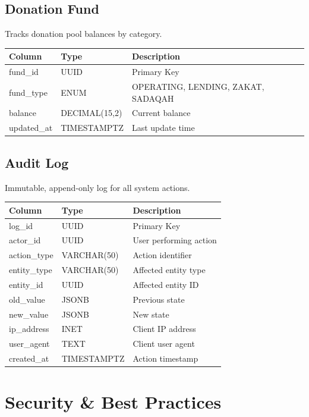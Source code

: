 \documentclass[11pt,a4paper]{article}
\begin{document}
\subsection{Donation Fund}

Tracks donation pool balances by category.

\begin{tabular}{@{}p{4cm}p{3cm}p{6cm}@{}}
\toprule
\textbf{Column} & \textbf{Type} & \textbf{Description} \\
\midrule
fund\_id & UUID & Primary Key \\
fund\_type & ENUM & OPERATING, LENDING, ZAKAT, SADAQAH \\
balance & DECIMAL(15,2) & Current balance \\
updated\_at & TIMESTAMPTZ & Last update time \\
\bottomrule
\end{tabular}

\subsection{Audit Log}

Immutable, append-only log for all system actions.

\begin{tabular}{@{}p{4cm}p{3cm}p{6cm}@{}}
\toprule
\textbf{Column} & \textbf{Type} & \textbf{Description} \\
\midrule
log\_id & UUID & Primary Key \\
actor\_id & UUID & User performing action \\
action\_type & VARCHAR(50) & Action identifier \\
entity\_type & VARCHAR(50) & Affected entity type \\
entity\_id & UUID & Affected entity ID \\
old\_value & JSONB & Previous state \\
new\_value & JSONB & New state \\
ip\_address & INET & Client IP address \\
user\_agent & TEXT & Client user agent \\
created\_at & TIMESTAMPTZ & Action timestamp \\
\bottomrule
\end{tabular}

\section{Security \& Best Practices}
\end{document}

